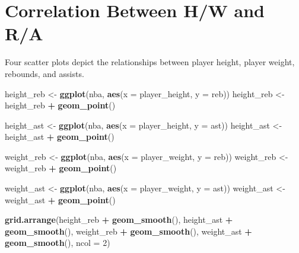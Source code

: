 \documentclass[
]{book}
\newenvironment{Shaded}{\begin{snugshade}}{\end{snugshade}}
\newcommand{\AttributeTok}[1]{\textcolor[rgb]{0.13,0.29,0.53}{#1}}
\newcommand{\DecValTok}[1]{\textcolor[rgb]{0.00,0.00,0.81}{#1}}
\newcommand{\FunctionTok}[1]{\textcolor[rgb]{0.13,0.29,0.53}{\textbf{#1}}}
\newcommand{\NormalTok}[1]{#1}
\newcommand{\OtherTok}[1]{\textcolor[rgb]{0.56,0.35,0.01}{#1}}
\newcommand{\SpecialCharTok}[1]{\textcolor[rgb]{0.81,0.36,0.00}{\textbf{#1}}}
\begin{document}
\hypertarget{correlation-between-hw-and-ra}{%
\section{Correlation Between H/W and R/A}\label{correlation-between-hw-and-ra}}

Four scatter plots depict the relationships between player height, player weight, rebounds, and assists.

\begin{Shaded}
\begin{Highlighting}[]
\NormalTok{height\_reb }\OtherTok{\textless{}{-}} \FunctionTok{ggplot}\NormalTok{(nba, }\FunctionTok{aes}\NormalTok{(}\AttributeTok{x =}\NormalTok{ player\_height,}
    \AttributeTok{y =}\NormalTok{ reb))}
\NormalTok{height\_reb }\OtherTok{\textless{}{-}}\NormalTok{ height\_reb }\SpecialCharTok{+} \FunctionTok{geom\_point}\NormalTok{()}

\NormalTok{height\_ast }\OtherTok{\textless{}{-}} \FunctionTok{ggplot}\NormalTok{(nba, }\FunctionTok{aes}\NormalTok{(}\AttributeTok{x =}\NormalTok{ player\_height,}
    \AttributeTok{y =}\NormalTok{ ast))}
\NormalTok{height\_ast }\OtherTok{\textless{}{-}}\NormalTok{ height\_ast }\SpecialCharTok{+} \FunctionTok{geom\_point}\NormalTok{()}

\NormalTok{weight\_reb }\OtherTok{\textless{}{-}} \FunctionTok{ggplot}\NormalTok{(nba, }\FunctionTok{aes}\NormalTok{(}\AttributeTok{x =}\NormalTok{ player\_weight,}
    \AttributeTok{y =}\NormalTok{ reb))}
\NormalTok{weight\_reb }\OtherTok{\textless{}{-}}\NormalTok{ weight\_reb }\SpecialCharTok{+} \FunctionTok{geom\_point}\NormalTok{()}

\NormalTok{weight\_ast }\OtherTok{\textless{}{-}} \FunctionTok{ggplot}\NormalTok{(nba, }\FunctionTok{aes}\NormalTok{(}\AttributeTok{x =}\NormalTok{ player\_weight,}
    \AttributeTok{y =}\NormalTok{ ast))}
\NormalTok{weight\_ast }\OtherTok{\textless{}{-}}\NormalTok{ weight\_ast }\SpecialCharTok{+} \FunctionTok{geom\_point}\NormalTok{()}
\end{Highlighting}
\end{Shaded}

\begin{Shaded}
\begin{Highlighting}[]
\FunctionTok{grid.arrange}\NormalTok{(height\_reb }\SpecialCharTok{+} \FunctionTok{geom\_smooth}\NormalTok{(),}
\NormalTok{    height\_ast }\SpecialCharTok{+} \FunctionTok{geom\_smooth}\NormalTok{(), weight\_reb }\SpecialCharTok{+}
        \FunctionTok{geom\_smooth}\NormalTok{(), weight\_ast }\SpecialCharTok{+} \FunctionTok{geom\_smooth}\NormalTok{(),}
    \AttributeTok{ncol =} \DecValTok{2}\NormalTok{)}
\end{Highlighting}
\end{Shaded}
\end{document}

